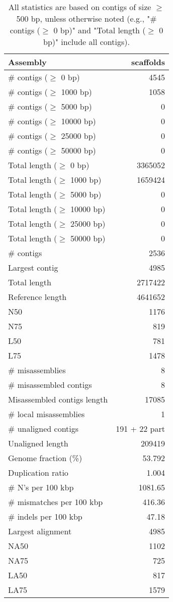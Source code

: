\documentclass[12pt,a4paper]{article}
\begin{document}
\begin{table}[ht]
\begin{center}
\caption{All statistics are based on contigs of size $\geq$ 500 bp, unless otherwise noted (e.g., "\# contigs ($\geq$ 0 bp)" and "Total length ($\geq$ 0 bp)" include all contigs).}
\begin{tabular}{|l*{1}{|r}|}
\hline
Assembly & scaffolds \\ \hline
\# contigs ($\geq$ 0 bp) & 4545 \\ \hline
\# contigs ($\geq$ 1000 bp) & 1058 \\ \hline
\# contigs ($\geq$ 5000 bp) & 0 \\ \hline
\# contigs ($\geq$ 10000 bp) & 0 \\ \hline
\# contigs ($\geq$ 25000 bp) & 0 \\ \hline
\# contigs ($\geq$ 50000 bp) & 0 \\ \hline
Total length ($\geq$ 0 bp) & 3365052 \\ \hline
Total length ($\geq$ 1000 bp) & 1659424 \\ \hline
Total length ($\geq$ 5000 bp) & 0 \\ \hline
Total length ($\geq$ 10000 bp) & 0 \\ \hline
Total length ($\geq$ 25000 bp) & 0 \\ \hline
Total length ($\geq$ 50000 bp) & 0 \\ \hline
\# contigs & 2536 \\ \hline
Largest contig & 4985 \\ \hline
Total length & 2717422 \\ \hline
Reference length & 4641652 \\ \hline
N50 & 1176 \\ \hline
N75 & 819 \\ \hline
L50 & 781 \\ \hline
L75 & 1478 \\ \hline
\# misassemblies & 8 \\ \hline
\# misassembled contigs & 8 \\ \hline
Misassembled contigs length & 17085 \\ \hline
\# local misassemblies & 1 \\ \hline
\# unaligned contigs & 191 + 22 part \\ \hline
Unaligned length & 209419 \\ \hline
Genome fraction (\%) & 53.792 \\ \hline
Duplication ratio & 1.004 \\ \hline
\# N's per 100 kbp & 1081.65 \\ \hline
\# mismatches per 100 kbp & 416.36 \\ \hline
\# indels per 100 kbp & 47.18 \\ \hline
Largest alignment & 4985 \\ \hline
NA50 & 1102 \\ \hline
NA75 & 725 \\ \hline
LA50 & 817 \\ \hline
LA75 & 1579 \\ \hline
\end{tabular}
\end{center}
\end{table}
\end{document}
